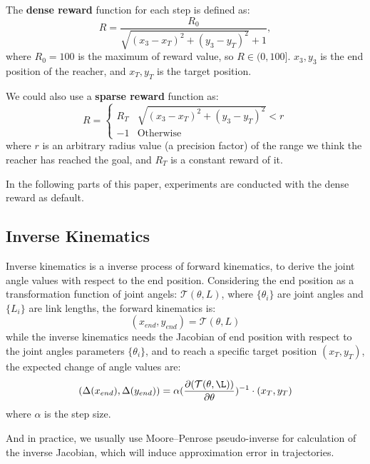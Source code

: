 \documentclass{article}
\begin{document}
The \textbf{dense reward} function for each step is defined as:
\begin{equation}
\label{equ:dense_reward}
 R=\frac{R_0}{\sqrt{(x_3-x_T)^2+(y_3-y_T)^2}+1}, 
\end{equation}
where $R_0=100$ is the maximum of reward value, so $R\in(0,100]$. $x_3, y_3$ is the end position of the reacher, and $x_T, y_T$ is the target position.

We could also use a \textbf{sparse reward} function as:
\begin{equation}
    R =
\begin{cases}
R_T& \sqrt{(x_3-x_T)^2+(y_3-y_T)^2}<r\\
-1& \text{Otherwise}
\end{cases}
\end{equation}
where $r$ is an arbitrary radius value (a precision factor) of the range we think the reacher has reached the goal, and $R_T$ is a constant reward of it.

In the following parts of this paper, experiments are conducted with the dense reward as default.

\subsection{Inverse Kinematics}
Inverse kinematics is a inverse process of forward kinematics, to derive the joint angle values with respect to the end position. Considering the end position as a transformation function of joint angels: $\mathcal{T}(\theta, L)$, where $\{\theta_i\}$ are joint angles and $\{L_i\}$ are link lengths, the forward kinematics is:
\begin{equation}
 (x_{end}, y_{end}) = \mathcal{T}(\theta, L)
\end{equation}
while the inverse kinematics needs the Jacobian of end position with respect to the joint angles parameters $\{\theta_i\}$, and to reach a specific target position $(x_T, y_T)$, the expected change of angle values are:
\begin{equation}
	(\Delta(x_{end}), \Delta(y_{end})) = \alpha (\frac{\partial(\mathcal{T}(\theta, \L))}{\partial \theta})^{-1} \cdot (x_T, y_T)
\end{equation}
where $\alpha$ is the step size. 

And in practice, we usually use Moore–Penrose pseudo-inverse for calculation of the inverse Jacobian, which will induce approximation error in trajectories.
\end{document}
